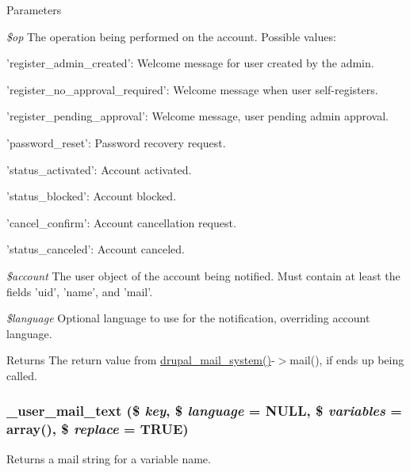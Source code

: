 \begin{DoxyParams}{Parameters}
\item[{\em \$op}]The operation being performed on the account. Possible values:
\begin{DoxyItemize}
\item 'register\_\-admin\_\-created': Welcome message for user created by the admin.
\item 'register\_\-no\_\-approval\_\-required': Welcome message when user self-\/registers.
\item 'register\_\-pending\_\-approval': Welcome message, user pending admin approval.
\item 'password\_\-reset': Password recovery request.
\item 'status\_\-activated': Account activated.
\item 'status\_\-blocked': Account blocked.
\item 'cancel\_\-confirm': Account cancellation request.
\item 'status\_\-canceled': Account canceled.
\end{DoxyItemize}\item[{\em \$account}]The user object of the account being notified. Must contain at least the fields 'uid', 'name', and 'mail'. \item[{\em \$language}]Optional language to use for the notification, overriding account language.\end{DoxyParams}
\begin{DoxyReturn}{Returns}
The return value from \hyperlink{mail_8inc_a6ba240b2e368447935c9bcb114f59a1a}{drupal\_\-mail\_\-system()}-\/$>$mail(), if ends up being called. 
\end{DoxyReturn}
\hypertarget{user_8module_afeb35780400f149e307cd4b4f1d358a1}{
\subsubsection[{\_\-user\_\-mail\_\-text}]{\setlength{\rightskip}{0pt plus 5cm}\_\-user\_\-mail\_\-text (\$ {\em key}, \/  \$ {\em language} = {\ttfamily NULL}, \/  \$ {\em variables} = {\ttfamily array()}, \/  \$ {\em replace} = {\ttfamily TRUE})}}
\label{user_8module_afeb35780400f149e307cd4b4f1d358a1}
Returns a mail string for a variable name.

